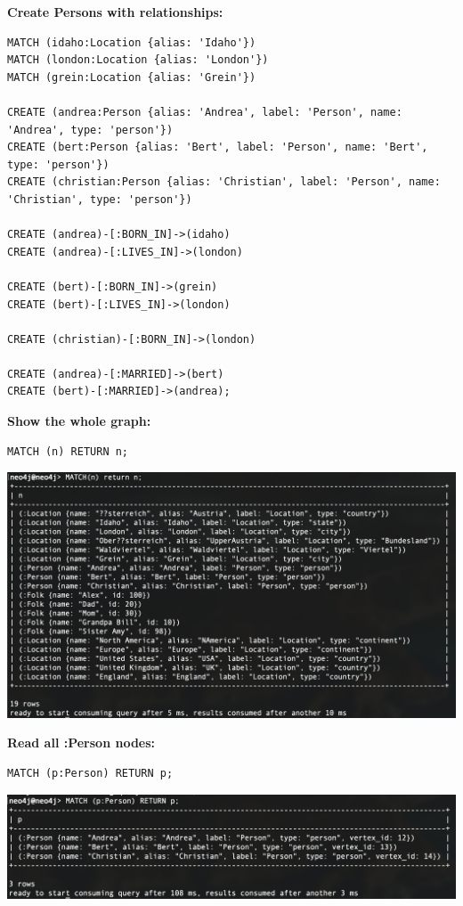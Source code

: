 \documentclass[14pt,a4paper]{extarticle}
\begin{document}
	\noindent \textbf{Create Persons with relationships:}
	\begin{lstlisting}[style=sql]
MATCH (idaho:Location {alias: 'Idaho'})
MATCH (london:Location {alias: 'London'})
MATCH (grein:Location {alias: 'Grein'})

CREATE (andrea:Person {alias: 'Andrea', label: 'Person', name: 'Andrea', type: 'person'})
CREATE (bert:Person {alias: 'Bert', label: 'Person', name: 'Bert', type: 'person'})
CREATE (christian:Person {alias: 'Christian', label: 'Person', name: 'Christian', type: 'person'})

CREATE (andrea)-[:BORN_IN]->(idaho)
CREATE (andrea)-[:LIVES_IN]->(london)

CREATE (bert)-[:BORN_IN]->(grein)
CREATE (bert)-[:LIVES_IN]->(london)

CREATE (christian)-[:BORN_IN]->(london)
	
CREATE (andrea)-[:MARRIED]->(bert)
CREATE (bert)-[:MARRIED]->(andrea);
	\end{lstlisting}


	\noindent \textbf{Show the whole graph:}
	\begin{lstlisting}[style=sql]
MATCH (n) RETURN n;
	\end{lstlisting}
	\includegraphics[width=\textwidth]{images/sc01.png}

	\pagebreak

	\noindent \textbf{Read all :Person nodes:}
	\begin{lstlisting}[style=sql]
MATCH (p:Person) RETURN p;
	\end{lstlisting}
	\includegraphics[width=\textwidth]{images/sc02.png}
\end{document}
